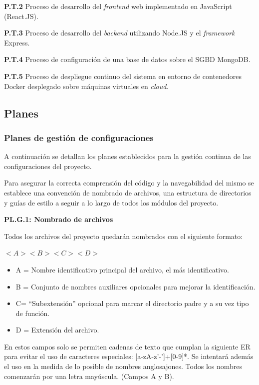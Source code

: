 \documentclass{article}
\begin{document}
\textbf{P.T.2} Proceso de desarrollo del \textit{frontend} web implementado en JavaScript (React.JS).
 
\textbf{P.T.3} Proceso de desarrollo del \textit{backend} utilizando Node.JS y el \textit{framework} Express.
 
\textbf{P.T.4} Proceso de configuración de una base de datos sobre el SGBD MongoDB.
 
\textbf{P.T.5} Proceso de despliegue continuo del sistema en entorno de contenedores Docker desplegado sobre máquinas virtuales en \textit{cloud}.
 
\pagebreak
\subsection{Planes}
 
\subsubsection{Planes de gestión de configuraciones}
A continuación se detallan los planes establecidos para la gestión continua de las configuraciones del
proyecto.
 
Para asegurar la correcta comprensión del código y la navegabilidad del mismo se establece una convención de nombrado de archivos, una estructura de directorios y guías de estilo a seguir a lo largo de todos los
módulos del proyecto.
 
\textbf{PL.G.1: Nombrado de archivos}
 
Todos los archivos del proyecto quedarán nombrados con el siguiente formato:
 
$<A><B><C><D>$
 
\begin{itemize}
   \setlength{\itemsep}{0em} %
   \item A = Nombre identificativo principal del archivo, el más identificativo.
   \item B = Conjunto de nombres auxiliares opcionales para mejorar la identificación.
   \item C= “Subextensión” opcional para marcar el directorio padre y a su vez tipo de función.
   \item D = Extensión del archivo.
\end{itemize}
 
En estos campos solo se permiten cadenas de texto que cumplan la siguiente ER para evitar el uso de  caracteres especiales: [a-zA-z'-']+[0-9]*. Se intentará además el uso en la medida de lo posible de nombres anglosajones. Todos los nombres comenzarán por una letra mayúscula. (Campos A y B).
 
\end{document}
